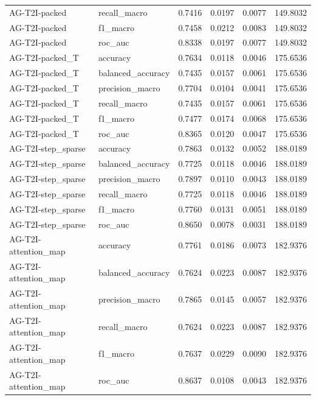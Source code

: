 \begin{tabular}{llrrrr}
AG-T2I-packed & recall_macro & 0.7416 & 0.0197 & 0.0077 & 149.8032 \\
AG-T2I-packed & f1_macro & 0.7458 & 0.0212 & 0.0083 & 149.8032 \\
AG-T2I-packed & roc_auc & 0.8338 & 0.0197 & 0.0077 & 149.8032 \\
AG-T2I-packed_T & accuracy & 0.7634 & 0.0118 & 0.0046 & 175.6536 \\
AG-T2I-packed_T & balanced_accuracy & 0.7435 & 0.0157 & 0.0061 & 175.6536 \\
AG-T2I-packed_T & precision_macro & 0.7704 & 0.0104 & 0.0041 & 175.6536 \\
AG-T2I-packed_T & recall_macro & 0.7435 & 0.0157 & 0.0061 & 175.6536 \\
AG-T2I-packed_T & f1_macro & 0.7477 & 0.0174 & 0.0068 & 175.6536 \\
AG-T2I-packed_T & roc_auc & 0.8365 & 0.0120 & 0.0047 & 175.6536 \\
AG-T2I-step_sparse & accuracy & 0.7863 & 0.0132 & 0.0052 & 188.0189 \\
AG-T2I-step_sparse & balanced_accuracy & 0.7725 & 0.0118 & 0.0046 & 188.0189 \\
AG-T2I-step_sparse & precision_macro & 0.7897 & 0.0110 & 0.0043 & 188.0189 \\
AG-T2I-step_sparse & recall_macro & 0.7725 & 0.0118 & 0.0046 & 188.0189 \\
AG-T2I-step_sparse & f1_macro & 0.7760 & 0.0131 & 0.0051 & 188.0189 \\
AG-T2I-step_sparse & roc_auc & 0.8650 & 0.0078 & 0.0031 & 188.0189 \\
AG-T2I-attention_map & accuracy & 0.7761 & 0.0186 & 0.0073 & 182.9376 \\
AG-T2I-attention_map & balanced_accuracy & 0.7624 & 0.0223 & 0.0087 & 182.9376 \\
AG-T2I-attention_map & precision_macro & 0.7865 & 0.0145 & 0.0057 & 182.9376 \\
AG-T2I-attention_map & recall_macro & 0.7624 & 0.0223 & 0.0087 & 182.9376 \\
AG-T2I-attention_map & f1_macro & 0.7637 & 0.0229 & 0.0090 & 182.9376 \\
AG-T2I-attention_map & roc_auc & 0.8637 & 0.0108 & 0.0043 & 182.9376 \\
\bottomrule
\end{tabular}
